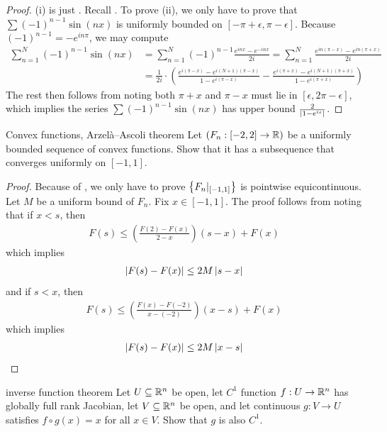 \documentclass{report}
\begin{document}
\begin{proof}
(i) is just . Recall . To prove (ii), we only have to prove that $\sum (-1)^{n-1}\sin (nx)$ is uniformly bounded on $[-\pi +\epsilon ,\pi -\epsilon ]$. Because  $(-1)^{n-1}=-e^{in\pi}$, we may compute 
\begin{align*}
\sum_{n=1}^N (-1)^{n-1} \sin (nx)&= \sum_{n=1}^N  (-1)^{n-1}\frac{e^{inx}-e^{-inx}}{2i} = \sum_{n=1}^N \frac{e^{in(\pi -x)}- e^{in(\pi +x)}}{2i} \\
&=\frac{1}{2i}\cdot \left( \frac{e^{i(\pi -x)}-e^{i(N+1)(\pi -x)}}{1- e^{i(\pi -x)}} - \frac{e^{i(\pi +x)}- e^{i(N+1)(\pi +x)}}{1- e^{i(\pi +x)}}\right)
\end{align*}
The rest then follows from noting both $\pi +x$ and $\pi -x$  must lie in $[\epsilon  ,2\pi -\epsilon ]$, which implies the series  $\sum  (-1)^{n-1}\sin (nx)$ has upper bound $\frac{2}{\left|1-e^{i \epsilon }\right|}$. 
\end{proof}
\begin{question}{Convex functions, Arzelà–Ascoli theorem}{}
Let $(F_n:[-2,2]\rightarrow \mathbb{R})$ be a uniformly bounded sequence of convex functions. Show that it has a subsequence that converges uniformly on $[-1,1]$. 
\end{question}
\begin{proof}
Because of , we only have to prove  $\left\{ F_n|_{[-1,1]} \right\}$ is pointwise equicontinuous. Let $M$ be a uniform bound of  $F_n$. Fix $x \in [-1,1]$. The proof follows from noting  that if $x<s$, then 
\begin{align*}
F(s)\leq \left( \frac{F(2)-F(x)}{2-x} \right) (s-x) + F(x)
\end{align*}
which implies  
\begin{align*}
\left|F(s)-F(x)\right| \leq  2M\left|s-x\right|
\end{align*}
and if $s<x$, then 
 \begin{align*}
F(s)\leq \left(\frac{F(x)-F(-2)}{x-(-2)} \right) (x-s)+ F(x)  
\end{align*}
which implies 
\begin{align*}
\left|F(s)-F(x)\right|\leq 2M \left|x-s\right|
\end{align*}
\end{proof}
\begin{question}{inverse function theorem}{}
Let $U\subseteq \mathbb{R}^n$ be open, let $C^1$ function $f:U\rightarrow \mathbb{R}^n$ has globally full rank Jacobian, let $V \subseteq \mathbb{R}^n$ be open, and let continuous $g:V\rightarrow U$ satisfies $f\circ g(x)=x$ for all $x\in V$. Show that $g$ is also $C^1$. 
\end{question}
\end{document}
